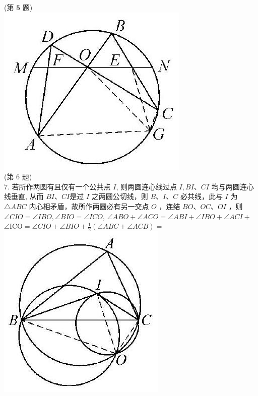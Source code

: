 \documentclass[10pt]{article}
\begin{document}
(第 $\mathbf{5}$ 题)\\
\includegraphics[max width=\textwidth, center]{2024_10_30_66b8e5e701da2093c133g-096(3)}\\
(第 6 题)\\
7. 若所作两圆有且仅有一个公共点 $I$, 则两圆连心线过点 $I, B I 、 C I$ 均与两圆连心线垂直, 从而 $B I 、 C I$是过 $I$ 之两圆公切线，则 $B 、 I 、 C$ 必共线，此与 $I$ 为 $\triangle A B C$ 内心相矛盾，故所作两圆必有另一交点 $O$ ，连结 $B O 、 O C 、 O I$ ，则 $\angle C I O=\angle I B O, \angle B I O=\angle I C O$, $\angle A B O+\angle A C O=\angle A B I+\angle I B O+\angle A C I+$ $\angle \mathrm{ICO}=\angle C I O+\angle B I O+\frac{1}{2}(\angle A B C+\angle A C B)=$\\
\includegraphics[max width=\textwidth, center]{2024_10_30_66b8e5e701da2093c133g-097}\\
\end{document}
